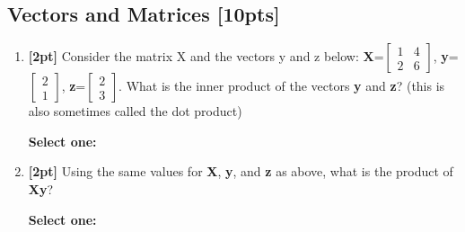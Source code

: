 \documentclass[12pt]{article}
\renewcommand{\circle}{\tikz\draw[black] (0,0) circle (1ex);}
\begin{document}
\subsection{Vectors and Matrices [10pts]}
\begin{enumerate}
    \item \textbf{[2pt]} Consider the matrix X and the vectors y and z below: \textbf{X}=$\begin{bmatrix} 1 & 4 \\ 2 & 6 \end{bmatrix}$, \textbf{y}=$\begin{bmatrix} 2 \\ 1 \end{bmatrix}$, \textbf{z}=$\begin{bmatrix} 2 \\ 3 \end{bmatrix}$. What is the inner product of the vectors \textbf{y} and \textbf{z}? (this is also sometimes called the dot product)

    \textbf{Select one:}


    \item \textbf{[2pt]} Using the same values for \textbf{X}, \textbf{y}, and \textbf{z} as above, what is the product of \textbf{Xy}?

    \textbf{Select one:}



\end{enumerate}
\end{document}
